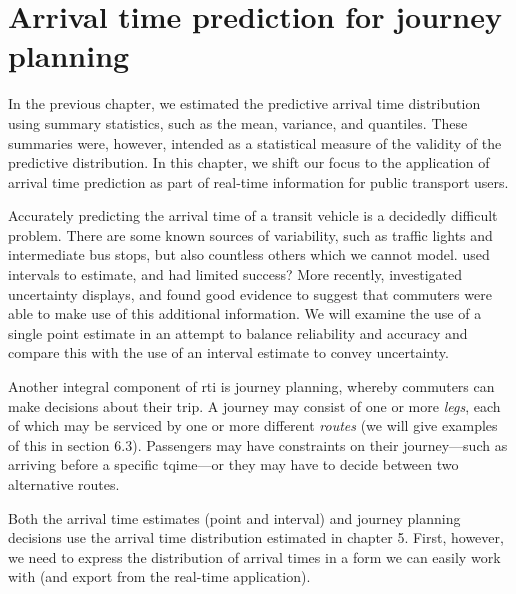 
\chapter{Arrival time prediction for journey planning}
\label{cha:etas}

In the previous chapter, we estimated the predictive arrival time distribution using summary statistics, such as the mean, variance, and quantiles. These summaries were, however, intended as a statistical measure of the validity of the predictive distribution. In this chapter, we shift our focus to the application of arrival time prediction as part of real-time information for public transport users.

Accurately predicting the arrival time of a transit vehicle is a decidedly difficult problem. There are some known sources of variability, such as traffic lights and intermediate bus stops, but also countless others which we cannot model. \Cite{} used intervals to estimate, and had limited success? More recently, \cite{} investigated uncertainty displays, and found good evidence to suggest that commuters were able to make use of this additional information. We will examine the use of a single point estimate in an attempt to balance reliability and accuracy and compare this with the use of an interval estimate to convey uncertainty.

Another integral component of \gls{rti} is journey planning, whereby commuters can make decisions about their trip. A journey may consist of one or more \emph{legs}, each of which may be serviced by one or more different \emph{routes} (we will give examples of this in section 6.3). Passengers may have constraints on their journey---such as arriving before a specific tqime---or they may have to decide between two alternative routes.

Both the arrival time estimates (point and interval) and journey planning decisions use the arrival time distribution estimated in chapter 5. First, however, we need to express the distribution of arrival times in a form we can easily work with (and export from the real-time application).






